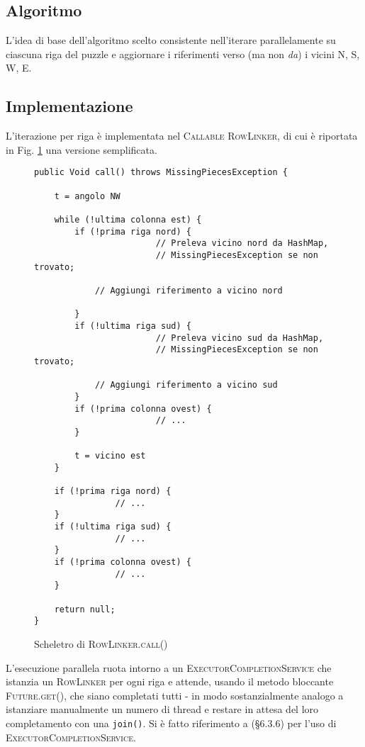\documentclass[a4paper]{article}
\newcommand{\Classname}[1]{\textsc{#1}}
\newcommand{\Ifacename}[1]{\textsc{#1}}
\newcommand{\Methodname}[1]{\texttt{#1}}
\begin{document}
\subsection{Algoritmo}
L'idea di base dell'algoritmo scelto consistente nell'iterare parallelamente su ciascuna riga del puzzle e aggiornare i riferimenti verso (ma non \emph{da}) i vicini N, S, W, E.

\subsection{Implementazione}
L'iterazione per riga \`e implementata nel \Ifacename{Callable} \Classname{RowLinker}, di cui \`e riportata in Fig. \ref{rowlinker} una versione semplificata.


\begin{figure}[h!]
  \centering
\begin{lstlisting}[frame=single]
public Void call() throws MissingPiecesException {

	t = angolo NW

	while (!ultima colonna est) {
		if (!prima riga nord) {
                        // Preleva vicino nord da HashMap,
                        // MissingPiecesException se non trovato;

			// Aggiungi riferimento a vicino nord

		}
		if (!ultima riga sud) {
                        // Preleva vicino sud da HashMap,
                        // MissingPiecesException se non trovato;

			// Aggiungi riferimento a vicino sud
		}
		if (!prima colonna ovest) {
                        // ...
		}

		t = vicino est
	}

	if (!prima riga nord) {
                // ...
	}
	if (!ultima riga sud) {
                // ...
	}
	if (!prima colonna ovest) {
                // ...
	}

	return null;
}
\end{lstlisting}
\caption {Scheletro di \textsc{RowLinker.call()}}
\label{rowlinker}
\end{figure}


L'esecuzione parallela ruota intorno a un \Classname{ExecutorCompletionService} che istanzia un \Classname{RowLinker} per ogni riga e attende, usando il metodo bloccante \Ifacename{Future.get()}, che siano completati tutti - in modo sostanzialmente analogo a istanziare manualmente un numero di thread e restare in attesa del loro completamento con una \Methodname{join()}.
Si \`e fatto riferimento a \cite{goetz2006java} (§6.3.6) per l'uso di \Classname{ExecutorCompletionService}.
\end{document}
